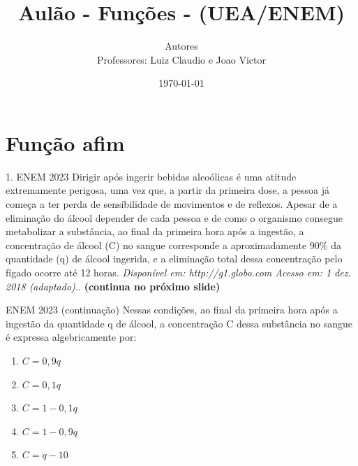 \documentclass[11pt]{beamer}
\author[CETi / IFAM CMC]{Autores \\ Professores: Luiz Claudio e Joao Victor}
\title{Aulão - Funções - (UEA/ENEM)}
\institute[]{CETi BILÍNGUE GILBERTO MESTRINHO \par INSTITUTO FEDERAL DO AMAZONAS }
\date{\today}
\begin{document}
\justifying
\onehalfspacing 

\begin{frame}
    \titlepage
\end{frame}

\section{Função afim}

\begin{frame}{1. ENEM 2023}
    Dirigir após ingerir bebidas alcoólicas é uma atitude extremamente perigosa, uma vez que, a partir da primeira dose, a pessoa já começa a ter perda de sensibilidade de movimentos e de reflexos. Apesar de a eliminação do álcool depender de cada pessoa e de como o organismo consegue metabolizar a substância, ao final da primeira hora após a ingestão, a concentração de álcool (C) no sangue corresponde a aproximadamente $90\%$ da quantidade (q) de álcool ingerida, e a eliminação total dessa concentração pelo fígado ocorre até 12 horas. \textit{Disponível em: http://g1.globo.com Acesso em: 1 dez. 2018 (adaptado).}. \vfill
    \textbf{(continua no próximo slide)}
\end{frame}

\begin{frame}{ENEM 2023 (continuação)}
    Nessas condições, ao final da primeira hora após a ingestão da quantidade q de álcool, a concentração C dessa substância no sangue é expressa algebricamente por:

    \begin{enumerate}[a]
                \item $C = 0,9q$ %
                \item $C = 0,1q$
                \item $C = 1 - 0,1q$
                \item $C = 1 - 0,9q$ 
                \item $C = q - 10$
            \end{enumerate}
\end{frame}
\end{document}
